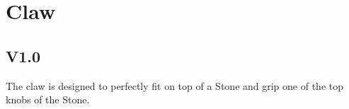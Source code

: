 

\section{Claw}
\subsection{V1.0}


$ $\\The claw is designed to perfectly fit on top of a Stone and grip one of the top knobs of the Stone.

